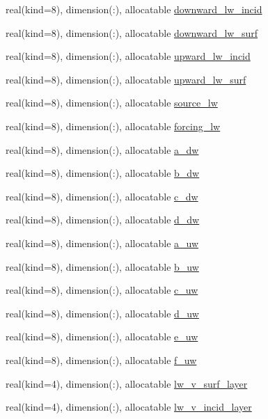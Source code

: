 \begin{DoxyCompactItemize}
real(kind=8), dimension(\+:), allocatable \hyperlink{namespacecanopy__layer__coms_a37049330a4fadfdf2eae9cbfcc91fe1b}{downward\+\_\+lw\+\_\+incid}
\item 
real(kind=8), dimension(\+:), allocatable \hyperlink{namespacecanopy__layer__coms_a496e9f59d415a923f750b48f0f099721}{downward\+\_\+lw\+\_\+surf}
\item 
real(kind=8), dimension(\+:), allocatable \hyperlink{namespacecanopy__layer__coms_ac0fbdef1967224d2069fe41c68ee8478}{upward\+\_\+lw\+\_\+incid}
\item 
real(kind=8), dimension(\+:), allocatable \hyperlink{namespacecanopy__layer__coms_ac46ee0cea4394729b21467637ff807d8}{upward\+\_\+lw\+\_\+surf}
\item 
real(kind=8), dimension(\+:), allocatable \hyperlink{namespacecanopy__layer__coms_acab9a0d2987be1eb3adf62b284d514f8}{source\+\_\+lw}
\item 
real(kind=8), dimension(\+:), allocatable \hyperlink{namespacecanopy__layer__coms_a456a3cd6ca31152aa6e000baf9ab668c}{forcing\+\_\+lw}
\item 
real(kind=8), dimension(\+:), allocatable \hyperlink{namespacecanopy__layer__coms_a2584d733078541cc3c82911c5178a352}{a\+\_\+dw}
\item 
real(kind=8), dimension(\+:), allocatable \hyperlink{namespacecanopy__layer__coms_a4a34e13a815b0c72c3ac6ab0e4cc3c42}{b\+\_\+dw}
\item 
real(kind=8), dimension(\+:), allocatable \hyperlink{namespacecanopy__layer__coms_ad0bcaad69c487152e827bca2f683297b}{c\+\_\+dw}
\item 
real(kind=8), dimension(\+:), allocatable \hyperlink{namespacecanopy__layer__coms_a59c98ff7aadc5fec828a1325cf3d05ba}{d\+\_\+dw}
\item 
real(kind=8), dimension(\+:), allocatable \hyperlink{namespacecanopy__layer__coms_a0aee7af32fcb60ed8f8935d4d74ea9db}{a\+\_\+uw}
\item 
real(kind=8), dimension(\+:), allocatable \hyperlink{namespacecanopy__layer__coms_ace887e140ffc0ef5ba218f09ce5dd6db}{b\+\_\+uw}
\item 
real(kind=8), dimension(\+:), allocatable \hyperlink{namespacecanopy__layer__coms_adb9b19c4fae670208f123d80f3913252}{c\+\_\+uw}
\item 
real(kind=8), dimension(\+:), allocatable \hyperlink{namespacecanopy__layer__coms_ab3513d3090f9936bbf406d57ff8dcd29}{d\+\_\+uw}
\item 
real(kind=8), dimension(\+:), allocatable \hyperlink{namespacecanopy__layer__coms_aa70ec83b3221ee7aee0beedb704c2b9f}{e\+\_\+uw}
\item 
real(kind=8), dimension(\+:), allocatable \hyperlink{namespacecanopy__layer__coms_ac42fff0528a6772261cedc0d1ddf51ed}{f\+\_\+uw}
\item 
real(kind=4), dimension(\+:), allocatable \hyperlink{namespacecanopy__layer__coms_afc08d9f0b2aac2484cb5ec912eaaa1c2}{lw\+\_\+v\+\_\+surf\+\_\+layer}
\item 
real(kind=4), dimension(\+:), allocatable \hyperlink{namespacecanopy__layer__coms_afc304625420857d7ec564e4598123446}{lw\+\_\+v\+\_\+incid\+\_\+layer}
\end{DoxyCompactItemize}


